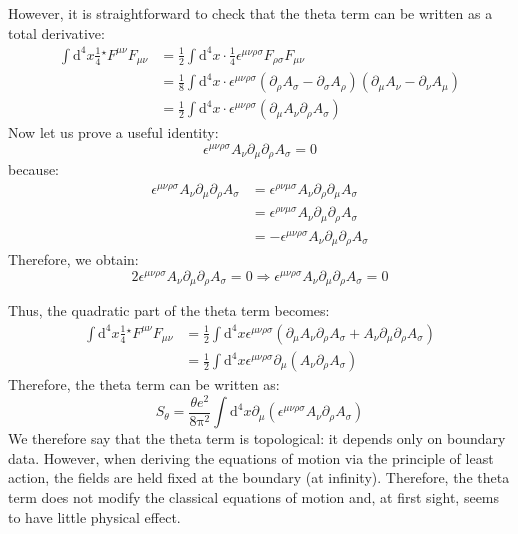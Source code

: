 However, it is straightforward to check that the theta term can be written as a total derivative:
\begin{equation}
\begin{aligned}
\int \mathrm{d}^4x \frac{1}{4} {}^\star F^{\mu\nu} F_{\mu\nu} &= \frac{1}{2} \int \mathrm{d}^4x \cdot \frac{1}{4} \epsilon^{\mu\nu\rho\sigma} F_{\rho\sigma} F_{\mu\nu} \\
&= \frac{1}{8} \int \mathrm{d}^4x \cdot \epsilon^{\mu\nu\rho\sigma} (\partial_\rho A_\sigma - \partial_\sigma A_\rho) (\partial_\mu A_\nu - \partial_\nu A_\mu) \\
&= \frac{1}{2} \int \mathrm{d}^4x \cdot \epsilon^{\mu\nu\rho\sigma} (\partial_\mu A_\nu \partial_\rho A_\sigma)
\end{aligned}
\end{equation}
Now let us prove a useful identity:
\begin{equation}
\epsilon^{\mu\nu\rho\sigma} A_\nu \partial_\mu \partial_\rho A_\sigma = 0
\end{equation}
because:
\begin{equation}
\begin{aligned}
\epsilon^{\mu\nu\rho\sigma} A_\nu \partial_\mu \partial_\rho A_\sigma &= \epsilon^{\rho\nu\mu\sigma} A_\nu \partial_\rho \partial_\mu A_\sigma \\
&= \epsilon^{\rho\nu\mu\sigma} A_\nu \partial_\mu \partial_\rho A_\sigma \\
&= -\epsilon^{\mu\nu\rho\sigma} A_\nu \partial_\mu \partial_\rho A_\sigma
\end{aligned}
\end{equation}
Therefore, we obtain:
\begin{equation}
2\epsilon^{\mu\nu\rho\sigma} A_\nu \partial_\mu \partial_\rho A_\sigma = 0 \Rightarrow \epsilon^{\mu\nu\rho\sigma} A_\nu \partial_\mu \partial_\rho A_\sigma = 0
\end{equation}

Thus, the quadratic part of the theta term becomes:
\begin{equation}
\begin{aligned}
\int \mathrm{d}^4x \frac{1}{4} {}^\star F^{\mu\nu} F_{\mu\nu} &= \frac{1}{2} \int \mathrm{d}^4x \epsilon^{\mu\nu\rho\sigma} (\partial_\mu A_\nu \partial_\rho A_\sigma + A_\nu \partial_\mu \partial_\rho A_\sigma) \\
&= \frac{1}{2} \int \mathrm{d}^4x \epsilon^{\mu\nu\rho\sigma} \partial_\mu (A_\nu \partial_\rho A_\sigma)
\end{aligned}
\end{equation}
Therefore, the theta term can be written as:
\begin{equation}
S_\theta = \frac{\theta e^2}{8\mathrm{\pi}^2} \int \mathrm{d}^4x \partial_\mu (\epsilon^{\mu\nu\rho\sigma} A_\nu \partial_\rho A_\sigma)
\end{equation}
We therefore say that the theta term is topological: it depends only on boundary data. 
However, when deriving the equations of motion via the principle of least action, 
the fields are held fixed at the boundary (at infinity). 
Therefore, the theta term does not modify the classical equations of motion and, at first sight, seems to have little physical effect.

